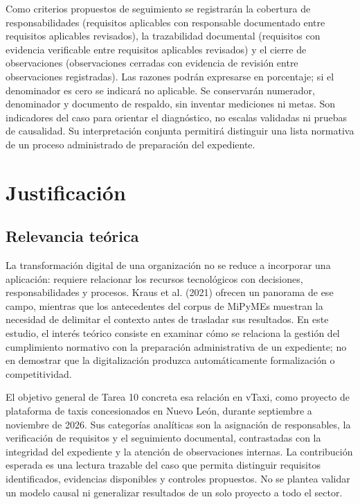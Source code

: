 {Como criterios propuestos de seguimiento se registrarán la cobertura de responsabilidades (requisitos aplicables con responsable documentado entre requisitos aplicables revisados), la trazabilidad documental (requisitos con evidencia verificable entre requisitos aplicables revisados) y el cierre de observaciones (observaciones cerradas con evidencia de revisión entre observaciones registradas). Las razones podrán expresarse en porcentaje; si el denominador es cero se indicará no aplicable. Se conservarán numerador, denominador y documento de respaldo, sin inventar mediciones ni metas. Son indicadores del caso para orientar el diagnóstico, no escalas validadas ni pruebas de causalidad. Su interpretación conjunta permitirá distinguir una lista normativa de un proceso administrado de preparación del expediente.


\section{Justificación}
\subsection{Relevancia teórica}
La transformación digital de una organización no se reduce a incorporar una aplicación: requiere relacionar los recursos tecnológicos con decisiones, responsabilidades y procesos. Kraus et al. (2021) ofrecen un panorama de ese campo, mientras que los antecedentes del corpus de MiPyMEs muestran la necesidad de delimitar el contexto antes de trasladar sus resultados. En este estudio, el interés teórico consiste en examinar cómo se relaciona la gestión del cumplimiento normativo con la preparación administrativa de un expediente; no en demostrar que la digitalización produzca automáticamente formalización o competitividad.


El objetivo general de Tarea 10 concreta esa relación en vTaxi, como proyecto de plataforma de taxis concesionados en Nuevo León, durante septiembre a noviembre de 2026. Sus categorías analíticas son la asignación de responsables, la verificación de requisitos y el seguimiento documental, contrastadas con la integridad del expediente y la atención de observaciones internas. La contribución esperada es una lectura trazable del caso que permita distinguir requisitos identificados, evidencias disponibles y controles propuestos. No se plantea validar un modelo causal ni generalizar resultados de un solo proyecto a todo el sector.


}

